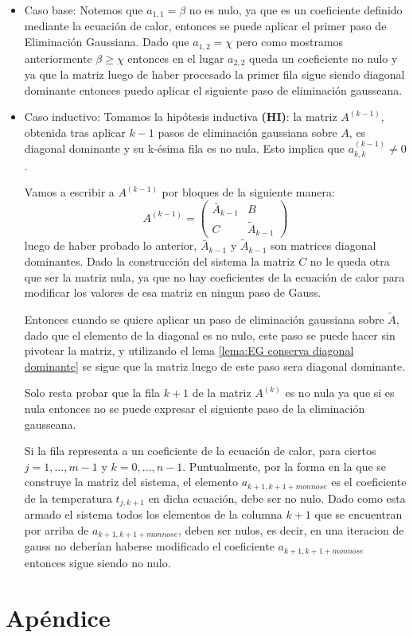 \documentclass[12pt]{article}
\begin{document}
	\begin{itemize}
		\item Caso base: Notemos que $a_{1,1} = \beta$ no es nulo, ya que es un coeficiente definido mediante la ecuación de calor, entonces se puede aplicar el primer paso de Eliminación Gaussiana. Dado que $a_{1,2} = \chi$ pero como mostramos anteriormente $\beta \ge \chi$ entonces en el lugar $a_{2,2}$ queda un coeficiente no nulo y ya que la matriz luego de haber procesado la primer fila sigue siendo diagonal dominante entonces puedo aplicar el siguiente paso de eliminación gausseana.
		
		\item Caso inductivo: 
		\subitem 	Tomamos la hipótesis inductiva \textbf{(HI)}: la matriz ${A}^{(k-1)}$, obtenida tras aplicar $k-1$ pasos de eliminación gaussiana sobre ${A}$, es diagonal dominante y su k-ésima fila es no nula. Esto implica que $a^{(k-1)}_{k,k} \neq 0$.
		
		Vamos a escribir a $A^{(k-1)}$ por bloques de la siguiente manera:
		\[ {A}^{(k-1)} = \left( \begin{matrix} \bar{A}_{k-1} & {B} \\ {C} & \widetilde{{A}}_{k-1} \end{matrix} \right) \]
		luego de haber probado lo anterior, $\bar{A}_{k-1}$ y $\widetilde{{A}}_{k-1}$ son matrices diagonal dominantes.
		Dado la construcción del sistema la matriz $C$ no le queda otra que ser la matriz nula, ya que no hay coeficientes de la ecuación de calor para modificar los valores de esa matriz en ningun paso de Gauss.
		
		Entonces cuando se quiere aplicar un paso de eliminación gaussiana sobre $\widetilde{A}$, dado que el elemento de la diagonal es no nulo, este paso se puede hacer sin pivotear la matriz, y utilizando el lema \ref{lema:EG conserva diagonal dominante} se sigue que la matriz luego de este paso sera diagonal dominante.
		
		Solo resta probar que la fila $k+1$ de la matriz ${A}^{(k)}$ es no nula ya que si es nula entonces no se puede expresar el siguiente paso de la eliminación gausseana.
		
		Si la fila representa a un coeficiente de la ecuación de calor, para ciertos $j = 1, \dots, m - 1$ y $k = 0, \dots, n - 1$. Puntualmente, por la forma en la que se construye la matriz del sistema, el elemento $a_{k+1,k+1+m o n nose}$ es el coeficiente de la temperatura $t_{j,k+1}$ en dicha ecuación, debe ser no nulo. Dado como esta armado el sistema todos los elementos de la columna $k+1$ que se encuentran por arriba de $a_{k+1,k+1+m o n nose}$, deben ser nulos, es decir, en una iteracion de gauss no deberían haberse modificado el coeficiente $a_{k+1,k+1+m o n nose}$ entonces sigue siendo no nulo.
	\end{itemize}
	




\section{Apéndice}

\tableofcontents

\listoffigures
\end{document}
